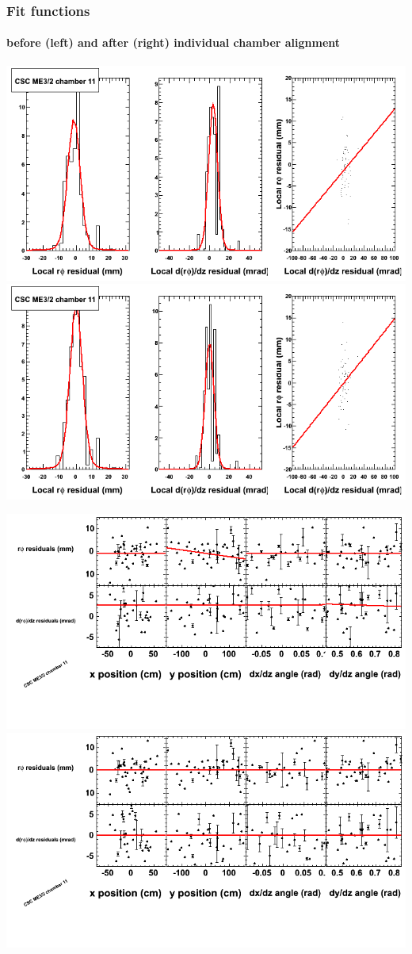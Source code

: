 \documentclass[compress]{beamer}
\begin{document}
\begin{frame}
\frametitle{Fit functions}
\framesubtitle{before (left) and after (right) individual chamber alignment}
\includegraphics[width=0.5\linewidth]{ringfits_3dof/beforefit_MEp32_11_bellcurve.png} \includegraphics[width=0.5\linewidth]{ringfits_3dof/afterfit_MEp32_11_bellcurve.png}

\includegraphics[width=0.5\linewidth]{ringfits_3dof/beforefit_MEp32_11_polynomials.png} \includegraphics[width=0.5\linewidth]{ringfits_3dof/afterfit_MEp32_11_polynomials.png}
\end{frame}
\end{document}
